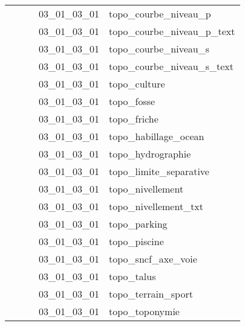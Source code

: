\documentclass[12pt,titlepage]{book}
\begin{document}
\begin{supertabular}{|p{7.5cm}|p{7.5cm}|p{7.5cm}|c|p{10cm}|}
                   &                    &                    & 03\_01\_03\_01 & topo\_courbe\_niveau\_p\\
                   &                    &                    & 03\_01\_03\_01 & topo\_courbe\_niveau\_p\_text\\
                   &                    &                    & 03\_01\_03\_01 & topo\_courbe\_niveau\_s\\
                   &                    &                    & 03\_01\_03\_01 & topo\_courbe\_niveau\_s\_text\\
                   &                    &                    & 03\_01\_03\_01 & topo\_culture\\
                   &                    &                    & 03\_01\_03\_01 & topo\_fosse\\
                   &                    &                    & 03\_01\_03\_01 & topo\_friche\\
                   &                    &                    & 03\_01\_03\_01 & topo\_habillage\_ocean\\
                   &                    &                    & 03\_01\_03\_01 & topo\_hydrographie\\
                   &                    &                    & 03\_01\_03\_01 & topo\_limite\_separative\\
                   &                    &                    & 03\_01\_03\_01 & topo\_nivellement\\
                   &                    &                    & 03\_01\_03\_01 & topo\_nivellement\_txt\\
                   &                    &                    & 03\_01\_03\_01 & topo\_parking\\
                   &                    &                    & 03\_01\_03\_01 & topo\_piscine\\
                   &                    &                    & 03\_01\_03\_01 & topo\_sncf\_axe\_voie\\
                   &                    &                    & 03\_01\_03\_01 & topo\_talus\\
                   &                    &                    & 03\_01\_03\_01 & topo\_terrain\_sport\\
                   &                    &                    & 03\_01\_03\_01 & topo\_toponymie\\

\end{supertabular}
\end{document}
